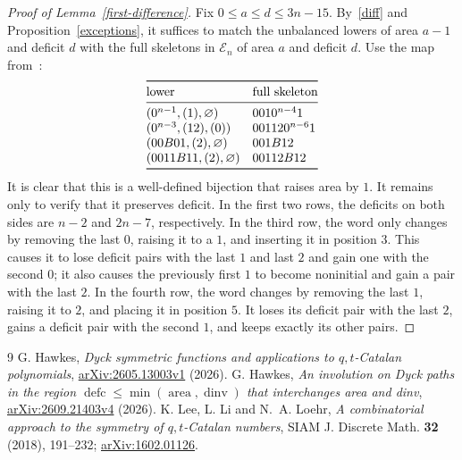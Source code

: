\documentclass[11pt]{article}
\DeclareMathOperator{\area}{area}\DeclareMathOperator{\dinv}{dinv}
\DeclareMathOperator{\defc}{defc}\DeclareMathOperator{\sym}{sym}
\begin{document}
\begin{proof}[Proof of Lemma~\ref{first-difference}]
Fix $0\le a\le d\le3n-15$. By~\eqref{diff} and Proposition~\ref{exceptions}, it suffices to match the unbalanced lowers of area $a-1$ and deficit $d$ with the full skeletons in $\mathcal E_n$ of area $a$ and deficit $d$. Use the map from~\cite[\S6.3]{H}:
\[
\begin{array}{@{}ll@{}}\toprule
 \text{lower}&\text{full skeleton}\\\midrule
 (0^{n-1},(1),\varnothing)&0010^{n-4}1\\
 (0^{n-3},(12),(0))&001120^{n-6}1\\
 (00B01,(2),\varnothing)&001B12\\
 (0011B11,(2),\varnothing)&00112B12\\\bottomrule
\end{array}
\]
It is clear that this is a well-defined bijection that raises area by $1$. It remains only to verify that it preserves deficit.
In the first two rows, the deficits on both sides are $n-2$ and $2n-7$, respectively. In the third row, the word only changes by removing the last $0$, raising it to a $1$, and inserting it in position $3$. This causes it to lose deficit pairs with the last $1$ and last $2$ and gain one with the second $0$; it also causes the previously first $1$ to become noninitial and gain a pair with the last $2$. In the fourth row, the word changes by removing the last $1$, raising it to $2$, and placing it in position $5$. It loses its deficit pair with the last $2$, gains a deficit pair with the second $1$, and keeps exactly its other pairs.

\end{proof}

\begin{thebibliography}{9}
 G. Hawkes, \emph{Dyck symmetric functions and applications to $q,t$-Catalan polynomials}, \href{https://arxiv.org/abs/2605.13003v1}{arXiv:2605.13003v1} (2026).
 G. Hawkes, \emph{An involution on Dyck paths in the region $\defc\le\min(\area,\dinv)$ that interchanges area and dinv}, \href{https://arxiv.org/abs/2609.21403v4}{arXiv:2609.21403v4} (2026).
 K. Lee, L. Li and N.~A. Loehr, \emph{A combinatorial approach to the symmetry of $q,t$-Catalan numbers}, SIAM J. Discrete Math. \textbf{32} (2018), 191--232; \href{https://arxiv.org/abs/1602.01126}{arXiv:1602.01126}.
\end{thebibliography}
\end{document}
